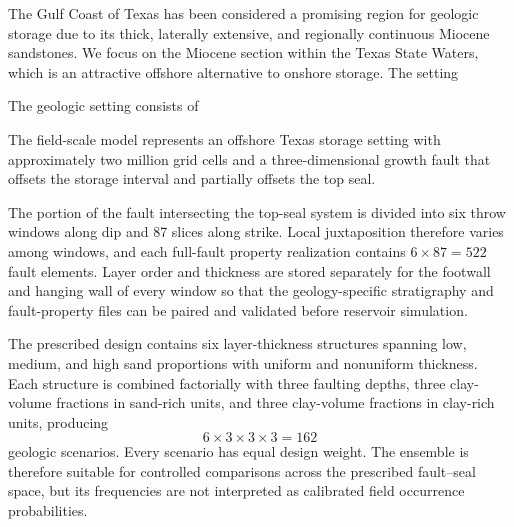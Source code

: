 
\label{sec:si-field-case-geologic-uncertainty}


The Gulf Coast of Texas has been considered a promising region for geologic \coTwo{} storage due to its thick, laterally extensive, and regionally continuous Miocene sandstones. We focus on the Miocene section within the Texas State Waters, which is an attractive offshore alternative to onshore storage. The setting








The geologic setting consists of



The field-scale model represents an offshore Texas storage setting with
approximately two million grid cells and a three-dimensional growth fault that
offsets the storage interval and partially offsets the top seal.



The portion of the fault intersecting the top-seal system is divided into six
throw windows along dip and 87 slices along strike. Local juxtaposition
therefore varies among windows, and each full-fault property realization
contains $6\times87=522$ fault elements. Layer order and thickness are stored
separately for the footwall and hanging wall of every window so that the
geology-specific stratigraphy and fault-property files can be paired and
validated before reservoir simulation.



The prescribed design contains six layer-thickness structures spanning low,
medium, and high sand proportions with uniform and nonuniform thickness. Each
structure is combined factorially with three faulting depths, three
clay-volume fractions in sand-rich units, and three clay-volume fractions in
clay-rich units, producing
\begin{equation}
  6\times3\times3\times3=162
\end{equation}
geologic scenarios. Every scenario has equal design weight. The ensemble is
therefore suitable for controlled comparisons across the prescribed
fault--seal space, but its frequencies are not interpreted as calibrated
field occurrence probabilities.


